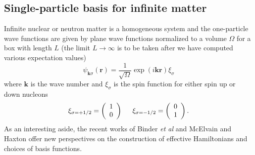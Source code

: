\subsection{Single-particle basis for infinite matter}

Infinite nuclear or neutron matter is a homogeneous system and the
one-particle wave functions are given by plane wave functions
normalized to a volume $\Omega$ for a box with length $L$ (the limit
$L\rightarrow \infty$ is to be taken after we have computed various
expectation values)
\[
\psi_{\mathbf{k}\sigma}(\mathbf{r})=
\frac{1}{\sqrt{\Omega}}\exp{(i\mathbf{kr})}\xi_{\sigma}
\]
where $\mathbf{k}$ is the wave number and $\xi_{\sigma}$ is the spin
function for either spin up or down nucleons
\[ 
\xi_{\sigma=+1/2}=\left(\begin{array}{c} 1
  \\ 0 \end{array}\right) \hspace{0.5cm}
\xi_{\sigma=-1/2}=\left(\begin{array}{c} 0 \\ 1 \end{array}\right).
\]
As an interesting aside, the recent works of Binder {\em et al} \cite{binder2016} and McElvain and Haxton
\cite{haxton2016} offer new perspectives on the construction of effective Hamiltonians and choices of basis functions.


